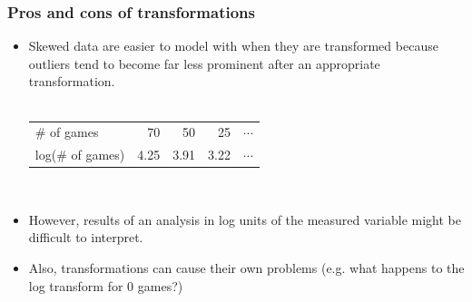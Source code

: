 \documentclass[slidestop,compress,mathserif]{beamer}
\makeatletter
\newcommand{\soln}[1]{\textit{#1}}
\def\chpii@path{../../../Chp 2}
\makeatother
\begin{document}
\begin{frame}
\frametitle{Pros and cons of transformations}

\begin{itemize}

\item Skewed data are easier to model with when they are transformed because outliers tend to become far less prominent after an appropriate transformation. \\
$\:$ \\
\renewcommand{\arraystretch}{1.5}
\begin{tabular}{l r r r r }
\# of games		&  70 	& 50 		& 25 		 		& $\cdots$ \\
log(\# of games)	& 4.25	& 3.91 	& 3.22 	 	& $\cdots$
\end{tabular}

$\:$ \\

\item However, results of an analysis in log units of the measured variable might be difficult to interpret.
\item Also, transformations can cause their own problems (e.g. what happens to the log transform for 0 games?)

\end{itemize}

\pause


\soln{}

\end{frame}






\end{document}

